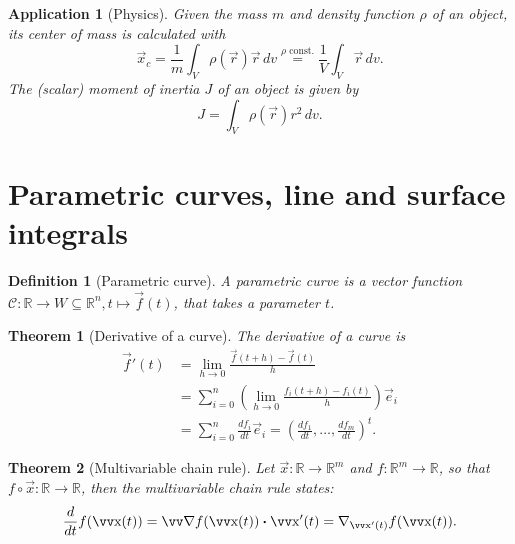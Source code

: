 \documentclass[twocolumn, margin=small]{tex/hsrzf}
\theoremstyle{fuvarzf}
\newtheorem{theorem}{Theorem}
\newtheorem{application}{Application}
\newtheorem{definition}{Definition}
\begin{document}
\begin{application}[Physics]
  Given the mass \(m\) and density function \(\rho\) of an object,
  its \emph{center of mass} is calculated with
  \[
    \vec{x}_c = \frac{1}{m}\int_V \rho(\vec{r})\vec{r} \,dv
      \stackrel{\rho\text{ const.}}{=} \frac{1}{V} \int_V \vec{r}\,dv .
  \]
  The (scalar) \emph{moment of inertia} \(J\) of an object is given by
  \[
    J = \int_V \rho(\vec{r}) r^2 \,dv .
  \]
\end{application}

\section{Parametric curves, line and surface integrals}

\begin{definition}[Parametric curve]
  A parametric curve is a vector function \(\mathcal{C} : \mathbb{R} \to W
  \subseteq \mathbb{R}^n, t \mapsto \vec{f}(t)\), that takes a parameter \(t\).
\end{definition}

\begin{theorem}[Derivative of a curve]
  The derivative of a curve is
  \begin{align*}
    \vec{f}'(t) &= \lim_{h\to 0} \frac{\vec{f}(t + h) - \vec{f}(t)}{h} \\
    &= \sum_{i=0}^n \left(\lim_{h\to 0} \frac{f_i(t+h) - f_i(t)}{h}\right) \vec{e}_i \\
    &= \sum_{i=0}^n \frac{df_i}{dt}\vec{e}_i
    = \left(\frac{df_1}{dt}, \ldots, \frac{df_m}{dt}\right)^t .
  \end{align*}
\end{theorem}


\begin{theorem}[Multivariable chain rule]
  Let \(\vec{x}: \mathbb{R} \to \mathbb{R}^m\) and \(f: \mathbb{R}^m \to
  \mathbb{R}\), so that \(f\circ\vec{x}: \mathbb{R} \to \mathbb{R}\), then
  the multivariable chain rule states:
  \[
    \frac{d}{dt}f(\vec{x}(t)) = \grad f (\vec{x}(t)) \dotp \vec{x}'(t)
      = \nabla_{\vec{x}'(t)} f(\vec{x}(t)) .
  \]
\end{theorem}
\end{document}
